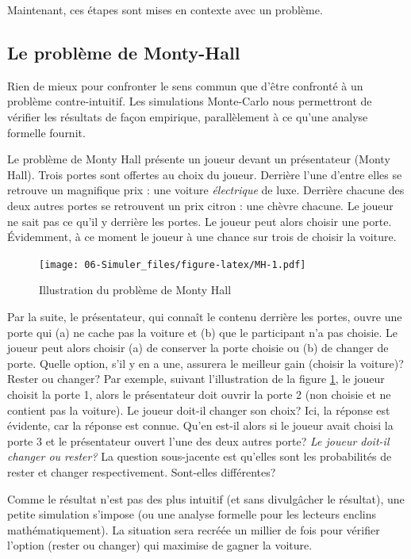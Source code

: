 \documentclass[
]{book}
\begin{document}
Maintenant, ces étapes sont mises en contexte avec un problème.

\hypertarget{le-probluxe8me-de-monty-hall}{%
\subsection{Le problème de Monty-Hall}\label{le-probluxe8me-de-monty-hall}}

Rien de mieux pour confronter le sens commun que d'être confronté à un problème contre-intuitif. Les simulations Monte-Carlo nous permettront de vérifier les résultats de façon empirique, parallèlement à ce qu'une analyse formelle fournit.

Le problème de Monty Hall \autocite[attribuables à][]{Selvin75} présente un joueur devant un présentateur (Monty Hall). Trois portes sont offertes au choix du joueur. Derrière l'une d'entre elles se retrouve un magnifique prix : une voiture \emph{électrique} de luxe. Derrière chacune des deux autres portes se retrouvent un prix citron : une chèvre chacune. Le joueur ne sait pas ce qu'il y derrière les portes. Le joueur peut alors choisir une porte. Évidemment, à ce moment le joueur à une chance sur trois de choisir la voiture.

\begin{figure}
\centering
\texttt{[image: 06-Simuler\_files/figure-latex/MH-1.pdf]}
\caption{\label{fig:MH}Illustration du problème de Monty Hall}
\end{figure}

Par la suite, le présentateur, qui connaît le contenu derrière les portes, ouvre une porte qui (a) ne cache pas la voiture et (b) que le participant n'a pas choisie. Le joueur peut alors choisir (a) de conserver la porte choisie ou (b) de changer de porte. Quelle option, s'il y en a une, assurera le meilleur gain (choisir la voiture)? Rester ou changer? Par exemple, suivant l'illustration de la figure \ref{fig:MH}, le joueur choisit la porte 1, alors le présentateur doit ouvrir la porte 2 (non choisie et ne contient pas la voiture). Le joueur doit-il changer son choix? Ici, la réponse est évidente, car la réponse est connue. Qu'en est-il alors si le joueur avait choisi la porte 3 et le présentateur ouvert l'une des deux autres porte? \emph{Le joueur doit-il changer ou rester?} La question sous-jacente est qu'elles sont les probabilités de rester et changer respectivement. Sont-elles différentes?

Comme le résultat n'est pas des plus intuitif (et sans divulgâcher le résultat), une petite simulation s'impose (ou une analyse formelle pour les lecteurs enclins mathématiquement). La situation sera recréée un millier de fois pour vérifier l'option (rester ou changer) qui maximise de gagner la voiture.
\end{document}
